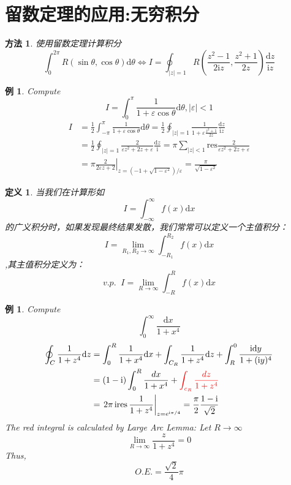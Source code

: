 \documentclass[10pt, a4paper, oneside]{ctexbook}
\newtheorem{definition}[theorem]{定义}
\newtheorem{example}[theorem]{例}
\newtheorem{method}[theorem]{方法}
\def\D{\mathrm{d}}
\begin{document}
\section{留数定理的应用:无穷积分}
\begin{method}
    使用留数定理计算积分
    $$
    \int_{0}^{2\pi} R(\sin \theta,\cos \theta) \D \theta \Leftrightarrow I=\oint_{|z|=1} R\left(\frac{z^{2}-1}{2 \mathrm{i} z}, \frac{z^{2}+1}{2 z}\right) \frac{\D z}{\mathrm{i} z}
    $$
\end{method}
\begin{example}
    Compute$$I=\int_{0}^{\pi} \frac{1}{1+\varepsilon \cos \theta} \D \theta,|\varepsilon|<1 $$
    \rm \begin{align*}
        I&=\frac{1}{2} \int_{-\pi}^{\pi} \frac{1}{1+\varepsilon \cos \theta} \D \theta=\frac{1}{2} \oint_{|z|=1} \frac{1}{1+\varepsilon \frac{z^{2}+1}{2 z}} \frac{\D z}{\mathrm{i} z} \\
        &=\frac{1}{2} \oint_{|z|=1} \frac{2}{\varepsilon z^{2}+2 z+\varepsilon} \frac{\D z}{\mathrm{i}}=\pi \sum_{|z|<1} \mathrm{res} \frac{2}{\varepsilon z^{2}+2 z+\varepsilon} \\
        &=\left.\pi \frac{2}{2 \varepsilon z+2}\right|_{z=\left(-1+\sqrt{1-\varepsilon^{2}}\right) / \varepsilon}=\frac{\pi}{\sqrt{1-\varepsilon^{2}}}
    \end{align*}
\end{example}
\begin{definition}
    当我们在计算形如$$I=\int_{-\infty}^\infty f(x) \D x$$的广义积分时，如果发现最终结果发散，我们常常可以定义一个主值积分：
    $$I=\lim_{R_1,R_2\to \infty} \int_{-R_1}^{R_2} f(x) \D x$$,其主值积分定义为：
    $$v.p. \;\; I = \lim_{R\to \infty} \int_{-R}^R f(x) \D x$$
\end{definition}
\begin{example}
    Compute $$\int_0^\infty \frac{\D x}{1+x^4}$$\rm
    \begin{align*}
    \oint_{C} \frac{1}{1+z^{4}} \D z&=\int_{0}^{R} \frac{1}{1+x^{4}} \D x+\int_{C_{R}} \frac{1}{1+z^{4}} \D z+\int_{R}^{0} \frac{\mathrm{i} \D y}{1+(\mathrm{i} y)^{4}}\\
    &=(1-\mathrm{i}) \int_{0}^{R} \frac{d x}{1+x^{4}}+{\color{red} \int_{c_{R}} \frac{d z}{1+z^{4}}}\\
    &=\left.2 \pi \operatorname{ires} \frac{1}{1+z^{4}}\right|_{z=e^{\mathrm{i} \pi / 4}}=\frac{\pi}{2} \frac{1-\mathrm{i}}{\sqrt{2}}
    \end{align*}
    The {\color{red}red integral} is calculated by Large Arc Lemma:
    Let $R \rightarrow \infty$
    $$
    \lim _{R \rightarrow \infty} \frac{z}{1+z^{4}}=0
    $$
    Thus,
    $$
    O.E.= \frac{\sqrt{2}}{4}\pi
    $$
\end{example}
\end{document}
